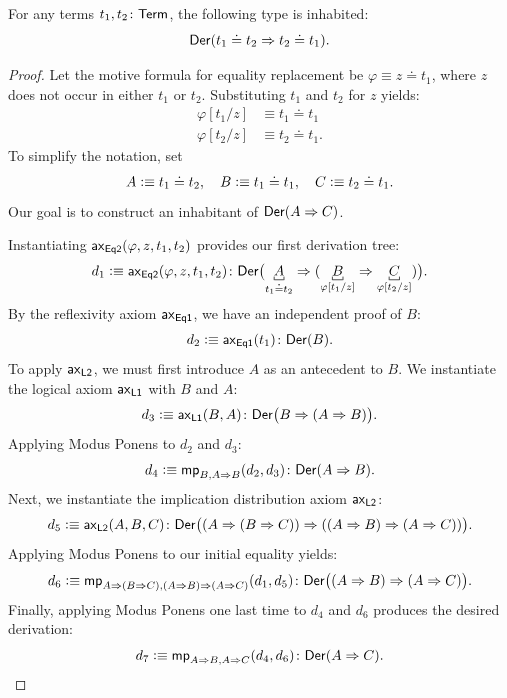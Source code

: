 \begin{lem}\label{lem:symmetry-equality}
    For any terms $t_1,t_2\colon\fun{Term}$, the following type is inhabited:
    \[
        \mathsf{Der}(t_1\doteq t_2\mathrel{\Rightarrow} t_2\doteq t_1).
    \]
\end{lem}

\begin{proof}
    Let the motive formula for equality replacement be $\varphi\equiv z\doteq t_1$, where $z$ does not occur in either $t_1$ or $t_2$. Substituting $t_1$ and $t_2$ for $z$ yields:
    \begin{align*}
        \varphi[t_1/z]&\equiv t_1\doteq t_1\\
        \varphi[t_2/z]&\equiv t_2\doteq t_1.
    \end{align*}
    To simplify the notation, set
    \begin{align*}
        A\mathrel{\vcentcolon}\equiv t_1\doteq t_2,\quad
        B\mathrel{\vcentcolon}\equiv t_1\doteq t_1,\quad
        C\mathrel{\vcentcolon}\equiv t_2\doteq t_1.
    \end{align*}
    Our goal is to construct an inhabitant of $\mathsf{Der}(A\mathrel{\Rightarrow} C)$. 
    
    Instantiating $\mathsf{ax}_{\mathsf{Eq2}}(\varphi,z,t_1,t_2)$ provides our first derivation tree:
    \[
        d_1\defeq\fun{ax}_{\fun{Eq2}}(\varphi,z,t_1,t_2)
            \colon
            \fun{Der}\bigl(
                \explain[t_1\doteq t_2]A\imp(
                    \explain[\varphi{[t_1/z]}]B
                    \imp
                    \explain[\varphi{[t_2/z]}]C
                )
            \bigr).
    \]
    By the reflexivity axiom $\mathsf{ax}_{\mathsf{Eq1}}$, we have an independent proof of $B$:
    \[
    d_2 \defeq \fun{ax}_{\fun{Eq1}}(t_1) \colon \fun{Der}(B).
    \]
    To apply $\mathsf{ax}_{\mathsf{L2}}$, we must first introduce $A$ as an antecedent to $B$. We instantiate the logical axiom $\mathsf{ax}_{\mathsf{L1}}$ with $B$ and $A$:
    \[
        d_3\defeq\fun{ax}_{\fun{L1}}(B,A)\colon 
            \fun{Der}\bigl(
                B\imp(A\imp B)
            \bigr).
    \]
    Applying Modus Ponens to $d_2$ and $d_3$:
    \[
        d_4\defeq\fun{mp}_{B,A\imp B}(d_2,d_3)\colon
            \fun{Der}(A\imp B).
    \]
    Next, we instantiate the implication distribution axiom $\mathsf{ax}_{\mathsf{L2}}$:
    \[
        d_5\defeq\fun{ax}_{\fun{L2}}(A,B,C)
            \colon 
                \fun{Der}\bigl(
                    (A\imp(B\imp C))
                    \imp
                    ((A\imp B)\imp(A\imp C))
                \bigr).
    \]
    Applying Modus Ponens to our initial equality yields:
    \[
        d_6\defeq\fun{mp}_{
            A\imp(B\imp C),(A\imp B)\imp(A\imp C)}(
                d_1,
                d_5
            )\colon
                \fun{Der}\bigl(
                    (A\imp B)\imp(A\imp C)
                \bigr).
    \]
    Finally, applying Modus Ponens one last time to $d_4$ and $d_6$ produces the desired derivation:
    \[
        d_7\defeq\fun{mp}_{A\imp B,A\imp C}(d_4,d_6)
            \colon\fun{Der}(A\imp C).
    \]
\end{proof}

